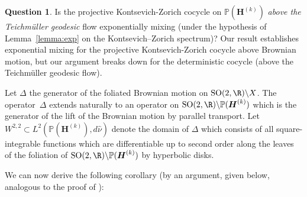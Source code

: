 \documentclass[10pt]{amsart}
\theoremstyle{plain}
\theoremstyle{definition}
\newtheorem{quest}[thm]{Question}
\numberwithin{equation}{subsection}
\newcommand\bP{\mathbb{P}}
\newcommand{\SO}{\mathrm{SO}}
\let\laplacian\Delta
\newcommand{\bfH}{\boldsymbol{H}}
\begin{document}
\begin{quest}\label{expmix} Is the projective Kontsevich-Zorich cocycle on $\bP(\bfH^{(k)})$ {\it above the Teichmüller geodesic} flow exponentially mixing
(under the hypothesis of Lemma~\ref{lemma:exp} on the Kontsevich--Zorich spectrum)? Our result establishes exponential mixing for the projective Kontsevich-Zorich cocycle above Brownian motion, but our argument breaks down for the deterministic cocycle (above the Teichmüller geodesic flow).

\end{quest}

Let $\laplacian$ the generator of the foliated Brownian
motion on $\SO(2, \R) \backslash X$. The operator~$\laplacian$ extends naturally to an operator on $\SO(2, \R) \backslash \bP(\bfH^{(k)})$ which is the generator of the lift of the Brownian motion by parallel transport. Let $W^{2,2} \subset L^2(\bP(\bfH^{(k)}), d\hat{\nu})$ denote the domain
of $\laplacian$ which consists of all square-integrable functions which are differentiable up to second order along the leaves of the foliation of $\SO(2, \R) \backslash \bP(\bfH^{(k)})$ by hyperbolic disks.

We can now derive the following corollary (by an argument, given below, analogous to the proof of \cite[Cor.\,1]{L95}):
\end{document}
